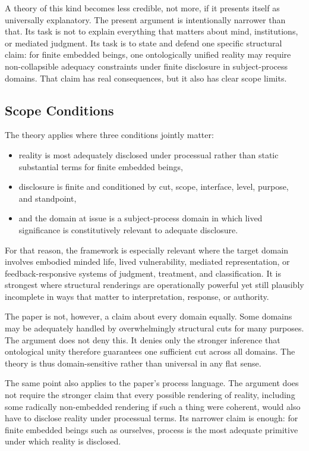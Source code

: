 \documentclass[11pt]{article}
\begin{document}
A theory of this kind becomes less credible, not more, if it presents itself as universally explanatory. The present argument is intentionally narrower than that. Its task is not to explain everything that matters about mind, institutions, or mediated judgment. Its task is to state and defend one specific structural claim: for finite embedded beings, one ontologically unified reality may require non-collapsible adequacy constraints under finite disclosure in subject-process domains. That claim has real consequences, but it also has clear scope limits.

\subsection{Scope Conditions}

The theory applies where three conditions jointly matter:
\begin{itemize}
    \item reality is most adequately disclosed under processual rather than static substantial terms for finite embedded beings,
    \item disclosure is finite and conditioned by cut, scope, interface, level, purpose, and standpoint,
    \item and the domain at issue is a subject-process domain in which lived significance is constitutively relevant to adequate disclosure.
\end{itemize}

For that reason, the framework is especially relevant where the target domain involves embodied minded life, lived vulnerability, mediated representation, or feedback-responsive systems of judgment, treatment, and classification. It is strongest where structural renderings are operationally powerful yet still plausibly incomplete in ways that matter to interpretation, response, or authority.

The paper is not, however, a claim about every domain equally. Some domains may be adequately handled by overwhelmingly structural cuts for many purposes. The argument does not deny this. It denies only the stronger inference that ontological unity therefore guarantees one sufficient cut across all domains. The theory is thus domain-sensitive rather than universal in any flat sense.

The same point also applies to the paper's process language. The argument does not require the stronger claim that every possible rendering of reality, including some radically non-embedded rendering if such a thing were coherent, would also have to disclose reality under processual terms. Its narrower claim is enough: for finite embedded beings such as ourselves, process is the most adequate primitive under which reality is disclosed.
\end{document}
